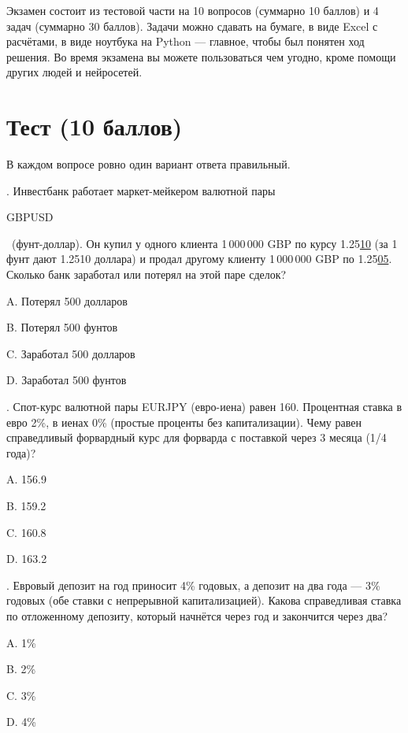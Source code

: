 \documentclass[a4paper,14pt]{extarticle}
\newcommand{\en}[1]{\begin{otherlanguage}{english}#1\end{otherlanguage}}
\begin{document}
\noindent Экзамен состоит из тестовой части на 10 вопросов (суммарно 10 баллов)  
и 4 задач (суммарно 30 баллов). Задачи можно сдавать на бумаге, в 
виде Excel с расчётами, в виде ноутбука на Python --- главное, чтобы был 
понятен ход решения. Во время экзамена вы можете пользоваться чем угодно, кроме
помощи других людей и нейросетей.

\section{Тест (10 баллов)}

\noindent В каждом вопросе ровно один вариант ответа правильный.

\vspace{\baselineskip}

. Инвестбанк работает маркет-мейкером валютной пары \en{GBPUSD}\ (фунт-доллар). Он купил у одного клиента 1\,000\,000 GBP по курсу 1.25\underline{10} (за 1 фунт дают 1.2510 доллара) и продал другому клиенту 1\,000\,000 GBP по 1.25\underline{05}. Сколько банк заработал или потерял на этой паре сделок?

A. Потерял 500 долларов

B. Потерял 500 фунтов

C. Заработал 500 долларов

D. Заработал 500 фунтов
 
\vspace{\baselineskip}

. Спот-курс валютной пары EURJPY (евро-иена) равен 160. Процентная ставка в евро 2\%, в иенах 0\% (простые проценты без капитализации). Чему равен справедливый форвардный курс для форварда с поставкой через 3 месяца (1/4 года)?

A. 156.9

B. 159.2

C. 160.8

D. 163.2

\vspace{\baselineskip}

. Евровый депозит на год приносит 4\% годовых, а депозит на два года ---
3\% годовых (обе ставки с непрерывной капитализацией). Какова справедливая ставка по
отложенному депозиту, который начнётся через год и закончится через два?

A. 1\%

B. 2\%

C. 3\%

D. 4\%

\vspace{\baselineskip}
\end{document}
